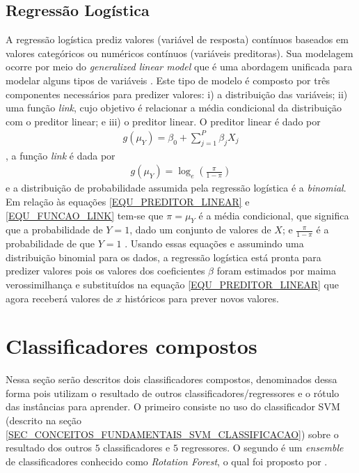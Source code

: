 \subsection{Regressão Logística}
A regressão logística prediz valores (variável de resposta) contínuos baseados em valores categóricos ou numéricos contínuos (variáveis preditoras). Sua modelagem ocorre por meio do \emph{generalized linear model} que é uma abordagem unificada para modelar alguns tipos de variáveis \cite{Agresti2015}. Este tipo de modelo é composto por três componentes necessários \cite{Agresti2015, Olsson2002} para predizer valores: i) a distribuição das variáveis; ii) uma função \emph{link}, cujo objetivo é relacionar a média condicional da distribuição com o preditor linear; e iii) o preditor linear. O preditor linear é dado por
\begin{align}
g(\mu_{Y}) = \beta_{0} + \sum\limits_{j = 1}^{P} \beta_{j}X_{j} \label{EQU_PREDITOR_LINEAR}
\end{align}
, a função \emph{link} é dada por
\begin{align}
g(\mu_{Y}) = \log_{e} \left( \frac{ \pi }{ 1 - \pi } \right)	\label{EQU_FUNCAO_LINK}
\end{align}
e a distribuição de probabilidade assumida pela regressão logística é a \emph{binomial}. Em relação às equações \eqref{EQU_PREDITOR_LINEAR} e \eqref{EQU_FUNCAO_LINK} tem-se que \(\pi = \mu_{Y}\) é a média condicional, que significa que a probabilidade de \(Y = 1\), dado um conjunto de valores de \(X\); e \(\frac{\pi}{1 - \pi}\) é a probabilidade de que \(Y = 1\) \cite{Olsson2002}. Usando essas equações e assumindo uma distribuição binomial para os dados, a regressão logística está pronta para predizer valores pois os valores dos coeficientes \(\beta\) foram estimados por maima verossimilhança e substituídos na equação \eqref{EQU_PREDITOR_LINEAR} que agora receberá valores de \(x\) históricos para prever novos valores.

\section{Classificadores compostos}\label{ENSEMBLES} %
Nessa seção serão descritos dois classificadores compostos, denominados dessa forma pois utilizam o resultado de outros classificadores/regressores e o rótulo das instâncias para aprender. O primeiro consiste no uso do classificador SVM (descrito na seção \ref{SEC_CONCEITOS_FUNDAMENTAIS_SVM_CLASSIFICACAO}) sobre o resultado dos outros \(5\) classificadores e \(5\) regressores.
O segundo é um \emph{ensemble} de classificadores conhecido como \emph{Rotation Forest}, o qual foi proposto por .

